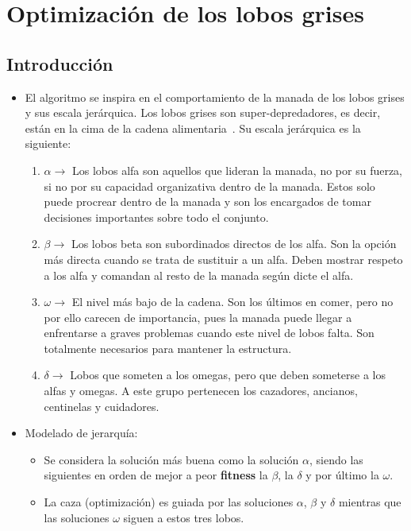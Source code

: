 \section{Optimización de los lobos grises}
\subsection{Introducción}

\begin{itemize}
    \item El algoritmo se inspira en el comportamiento de la manada de los lobos grises y sus escala jerárquica. Los lobos grises son super-depredadores, es decir, están en la cima de la cadena alimentaria~\cite{mirjalili_grey_2014}. Su escala jerárquica es la siguiente:
          \begin{enumerate}
              \item $\alpha\rightarrow$ Los lobos alfa son aquellos que lideran la manada, no por su fuerza, si no por su capacidad organizativa dentro de la manada. Estos solo puede procrear dentro de la manada y son los encargados de tomar decisiones importantes sobre todo el conjunto.
              \item $\beta\rightarrow$ Los lobos beta son subordinados directos de los alfa. Son la opción más directa cuando se trata de sustituir a un alfa. Deben mostrar respeto a los alfa y comandan al resto de la manada según dicte el alfa.
              \item $\omega\rightarrow$ El nivel más bajo de la cadena. Son los últimos en comer, pero no por ello carecen de importancia, pues la manada puede llegar a enfrentarse a graves problemas cuando este nivel de lobos falta. Son totalmente necesarios para mantener la estructura.
              \item $\delta\rightarrow$ Lobos que someten a los omegas, pero que deben someterse a los alfas y omegas. A este grupo pertenecen los cazadores, ancianos, centinelas y cuidadores.
          \end{enumerate}

    \item Modelado de jerarquía:
          \begin{itemize}
              \item Se considera la solución más buena como la solución $\alpha$, siendo las siguientes en orden de mejor a peor \textbf{fitness} la $\beta$, la $\delta$ y por último la $\omega$.
              \item La caza (optimización) es guiada por las soluciones $\alpha$, $\beta$ y $\delta$ mientras que las soluciones $\omega$ siguen a estos tres lobos.
          \end{itemize}
\end{itemize}

